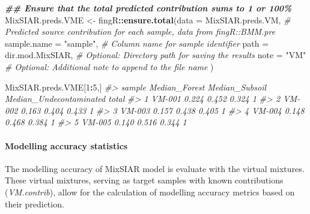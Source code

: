 \documentclass[
]{article}
\newenvironment{Shaded}{\begin{snugshade}}{\end{snugshade}}
\newcommand{\AttributeTok}[1]{\textcolor[rgb]{0.13,0.29,0.53}{#1}}
\newcommand{\CommentTok}[1]{\textcolor[rgb]{0.56,0.35,0.01}{\textit{#1}}}
\newcommand{\DecValTok}[1]{\textcolor[rgb]{0.00,0.00,0.81}{#1}}
\newcommand{\DocumentationTok}[1]{\textcolor[rgb]{0.56,0.35,0.01}{\textbf{\textit{#1}}}}
\newcommand{\FunctionTok}[1]{\textcolor[rgb]{0.13,0.29,0.53}{\textbf{#1}}}
\newcommand{\NormalTok}[1]{#1}
\newcommand{\OtherTok}[1]{\textcolor[rgb]{0.56,0.35,0.01}{#1}}
\newcommand{\SpecialCharTok}[1]{\textcolor[rgb]{0.81,0.36,0.00}{\textbf{#1}}}
\newcommand{\StringTok}[1]{\textcolor[rgb]{0.31,0.60,0.02}{#1}}
\begin{document}
\begin{Shaded}
\begin{Highlighting}[]
\DocumentationTok{\#\# Ensure that the total predicted contribution sums to 1 or 100\%}
\NormalTok{MixSIAR.preds.VME }\OtherTok{\textless{}{-}}\NormalTok{ fingR}\SpecialCharTok{::}\FunctionTok{ensure.total}\NormalTok{(}\AttributeTok{data =}\NormalTok{ MixSIAR.preds.VM,                      }\CommentTok{\# Predicted source contribution for each sample, data from fingR::BMM.pre}
                                          \AttributeTok{sample.name =} \StringTok{"sample"}\NormalTok{,                      }\CommentTok{\# Column name for sample identifier}
                                          \AttributeTok{path =}\NormalTok{ dir.mod.MixSIAR,                      }\CommentTok{\# Optional: Directory path for saving the results}
                                          \AttributeTok{note =} \StringTok{"VM"}                                  \CommentTok{\# Optional: Additional note to append to the file name}
\NormalTok{                                          )}
\end{Highlighting}
\end{Shaded}

\begin{Shaded}
\begin{Highlighting}[]
\NormalTok{MixSIAR.preds.VME[}\DecValTok{1}\SpecialCharTok{:}\DecValTok{5}\NormalTok{,]}
\CommentTok{\#\textgreater{}   sample Median\_Forest Median\_Subsoil Median\_Undecontaminated total}
\CommentTok{\#\textgreater{} 1 VM{-}001         0.224          0.452                   0.324     1}
\CommentTok{\#\textgreater{} 2 VM{-}002         0.163          0.404                   0.433     1}
\CommentTok{\#\textgreater{} 3 VM{-}003         0.157          0.438                   0.405     1}
\CommentTok{\#\textgreater{} 4 VM{-}004         0.148          0.468                   0.384     1}
\CommentTok{\#\textgreater{} 5 VM{-}005         0.140          0.516                   0.344     1}
\end{Highlighting}
\end{Shaded}

\hypertarget{modelling-accuracy-statistics-1}{%
\paragraph{Modelling accuracy
statistics}\label{modelling-accuracy-statistics-1}}

The modelling accuracy of MixSIAR model is evaluate with the virtual
mixtures. These virtual mixtures, serving as target samples with known
contributions (\emph{VM.contrib}), allow for the calculation of
modelling accuracy metrics based on their prediction.
\end{document}
